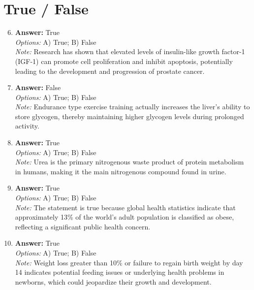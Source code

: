 \documentclass[12pt]{article}
\begin{document}
\section*{True / False}
\begin{enumerate}[label=\arabic*.]
\setcounter{enumi}{5}
\item \textbf{Answer:} True
\\ \textit{Options:} A) True; B) False
\\ \textit{Note:} Research has shown that elevated levels of insulin-like growth factor-1 (IGF-1) can promote cell proliferation and inhibit apoptosis, potentially leading to the development and progression of prostate cancer.
\item \textbf{Answer:} False
\\ \textit{Options:} A) True; B) False
\\ \textit{Note:} Endurance type exercise training actually increases the liver's ability to store glycogen, thereby maintaining higher glycogen levels during prolonged activity.
\item \textbf{Answer:} True
\\ \textit{Options:} A) True; B) False
\\ \textit{Note:} Urea is the primary nitrogenous waste product of protein metabolism in humans, making it the main nitrogenous compound found in urine.
\item \textbf{Answer:} True
\\ \textit{Options:} A) True; B) False
\\ \textit{Note:} The statement is true because global health statistics indicate that approximately 13\% of the world's adult population is classified as obese, reflecting a significant public health concern.
\item \textbf{Answer:} True
\\ \textit{Options:} A) True; B) False
\\ \textit{Note:} Weight loss greater than 10\% or failure to regain birth weight by day 14 indicates potential feeding issues or underlying health problems in newborns, which could jeopardize their growth and development.
\end{enumerate}
\end{document}
